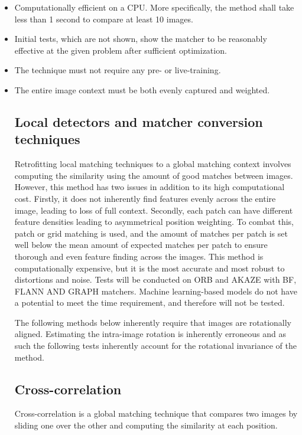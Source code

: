 \begin{itemize}
    \item Computationally efficient on a CPU. More specifically, the method shall take less than 1 second to compare at least 10 images. 
    \item Initial tests, which are not shown, show the matcher to be reasonably effective at the given problem after sufficient optimization.
    \item The technique must not require any pre- or live-training.
    \item The entire image context must be both evenly captured and weighted. 





\subsection*{Local detectors and matcher conversion techniques}
Retrofitting local matching techniques to a global matching context involves computing the similarity using the amount of good matches between images. However, this method has two issues in addition to its high computational cost. Firstly, it does not inherently find features evenly across the entire image, leading to loss of full context. Secondly, each patch can have different feature densities leading to asymmetrical position weighting. To combat this, patch or grid matching is used, and the amount of matches per patch is set well below the mean amount of expected matches per patch to ensure thorough and even feature finding across the images. This method is computationally expensive, but it is the most accurate and most robust to distortions and noise. Tests will be conducted on ORB and AKAZE with BF, FLANN AND GRAPH matchers. Machine learning-based models do not have a potential to meet the time requirement, and therefore will not be tested. 

The following methods below inherently require that images are rotationally aligned. Estimating the intra-image rotation is inherently erroneous and as such the following tests inherently account for the rotational invariance of the method. 

\subsection*{Cross-correlation}
Cross-correlation is a global matching technique that compares two images by sliding one over the other and computing the similarity at each position. 


\end{itemize}
